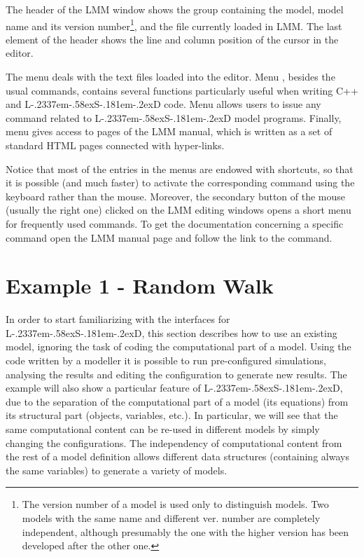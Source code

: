 \documentclass [11pt,a4paper] {book}
\def\LsD{{L\kern-.2337em\lower-.58ex\hbox{S}\kern-.181em\lower-.2ex\hbox{D}}\xspace}
\begin{document}
The header of the LMM window shows the group containing the model, model name and its version
number\footnote{The version number of a model is used only to distinguish models. Two
models with the same name and different ver. number are completely independent, although
presumably the one with the higher version has been developed after the other one.}, and
the file currently loaded in LMM. The last element of the header shows the line and
column position of the cursor in the editor.

The menu  deals with the text files loaded into the editor. Menu ,
besides the usual commands, contains several functions particularly useful when writing
C++ and \LsD code.  Menu  allows users to issue any command related to \LsD
model programs. Finally, menu  gives access to pages of the LMM manual,
which is written as a set of standard HTML pages connected with hyper-links. 

Notice that most of the entries in the menus are endowed with shortcuts, so that it is possible (and
much faster) to activate the corresponding command using the keyboard rather than the mouse. Moreover, the
secondary button of the mouse (usually the right one) clicked on the LMM editing windows
opens a short menu for frequently used commands. To get the documentation concerning a
specific command open the LMM manual page and follow the link to the command.


\section{Example 1 - Random Walk}\label{sec:usex}

In order to start familiarizing with the interfaces for \LsD, this section describes how to use an existing model, ignoring the task of coding the computational part of a model. Using the code written by a modeller it is possible to run pre-configured simulations, analysing the results and editing the configuration to generate new results. The example will also show a particular feature of \LsD, due to the separation of the computational part of a model (its equations) from its structural part (objects, variables, etc.). In particular, we will see that  the same computational content can be re-used in different models by simply changing the configurations. The independency of computational content from the rest of a model definition allows different data structures (containing always the same variables) to generate a variety of models.
\end{document}
